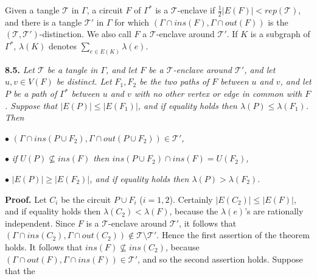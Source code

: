 Given a tangle $\mathscr{T}$ in $\Gamma$, a circuit $F$ of $\Gamma^*$ is a $\mathscr{T}$-enclave if $\frac{1}{2}|E(F)| < rep(\mathscr{T})$, and there is a tangle $\mathscr{T}'$ in $\Gamma$ for which $(\Gamma \cap ins(F), \Gamma \cap out(F))$ is the $(\mathscr{T}, \mathscr{T}')$-distinction. We also call $F$ a $\mathscr{T}$-enclave around $\mathscr{T}'$. If $K$ is a subgraph of $\Gamma^*$, $\lambda(K)$ denotes $\sum_{e \in E(K)} \lambda(e)$.

\textbf{8.5.} \textit{Let $\mathscr{T}$ be a tangle in $\Gamma$, and let $F$ be a $\mathscr{T}$-enclave around $\mathscr{T}'$, and let $u, v \in V(F)$ be distinct. Let $F_1, F_2$ be the two paths of $F$ between $u$ and $v$, and let $P$ be a path of $\Gamma^*$ between $u$ and $v$ with no other vertex or edge in common with $F$. Suppose that $|E(P)| \le |E(F_1)|$, and if equality holds then $\lambda(P) \le \lambda(F_1)$. Then}

\hspace*{12pt}$\bullet$ \textit{$(\Gamma \cap ins(P \cup F_2), \Gamma \cap out(P \cup F_2)) \in \mathscr{T}'$,}

\hspace*{12pt}$\bullet$ \textit{if $U(P) \nsubseteq ins(F)$ then $ins(P \cup F_2) \cap ins(F) = U(F_2)$,}

\hspace*{12pt}$\bullet$ \textit{$|E(P)| \ge |E(F_2)|$, and if equality holds then $\lambda(P) > \lambda(F_2)$.}

\textbf{Proof.} Let $C_i$ be the circuit $P \cup F_i$ ($i = 1, 2$). Certainly $|E(C_2)| \le |E(F)|$, and if equality holds then $\lambda(C_2) < \lambda(F)$, because the $\lambda(e)$'s are rationally independent. Since $F$ is a $\mathscr{T}$-enclave around $\mathscr{T}'$, it follows that $(\Gamma \cap ins(C_2), \Gamma \cap out(C_2)) \notin \mathscr{T} \setminus \mathscr{T}'$. Hence the first assertion of the theorem holds. It follows that $ins(F) \nsubseteq ins(C_2)$, because $(\Gamma \cap out(F), \Gamma \cap ins(F)) \in \mathscr{T}'$, and so the second assertion holds. Suppose that the

